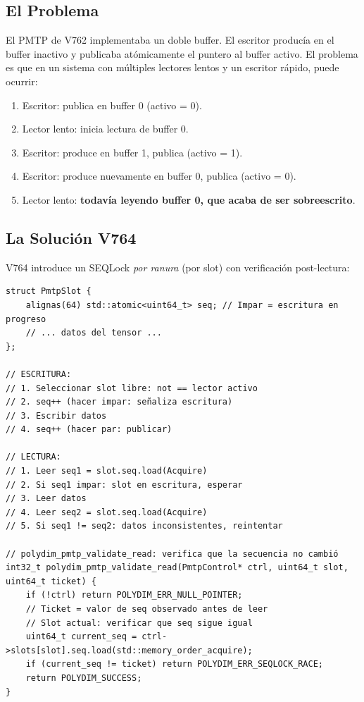 \subsection{El Problema}

El PMTP de V762 implementaba un doble buffer. El escritor producía en el buffer
inactivo y publicaba atómicamente el puntero al buffer activo. El problema es que
en un sistema con múltiples lectores lentos y un escritor rápido, puede ocurrir:

\begin{enumerate}
\item Escritor: publica en buffer 0 (activo = 0).
\item Lector lento: inicia lectura de buffer 0.
\item Escritor: produce en buffer 1, publica (activo = 1).
\item Escritor: produce nuevamente en buffer 0, publica (activo = 0).
\item Lector lento: \textbf{todavía leyendo buffer 0, que acaba de ser sobreescrito}.
\end{enumerate}

\subsection{La Solución V764}

V764 introduce un SEQLock \textit{por ranura} (por slot) con verificación post-lectura:

\begin{lstlisting}[style=cppstyle, caption={PMTP Triple Buffer con SEQLock por ranura --- V764}, label=lst:pmtp_triple]
struct PmtpSlot {
    alignas(64) std::atomic<uint64_t> seq; // Impar = escritura en progreso
    // ... datos del tensor ...
};

// ESCRITURA:
// 1. Seleccionar slot libre: not == lector activo
// 2. seq++ (hacer impar: señaliza escritura)
// 3. Escribir datos
// 4. seq++ (hacer par: publicar)

// LECTURA:
// 1. Leer seq1 = slot.seq.load(Acquire)
// 2. Si seq1 impar: slot en escritura, esperar
// 3. Leer datos
// 4. Leer seq2 = slot.seq.load(Acquire)
// 5. Si seq1 != seq2: datos inconsistentes, reintentar

// polydim_pmtp_validate_read: verifica que la secuencia no cambió
int32_t polydim_pmtp_validate_read(PmtpControl* ctrl, uint64_t slot, uint64_t ticket) {
    if (!ctrl) return POLYDIM_ERR_NULL_POINTER;
    // Ticket = valor de seq observado antes de leer
    // Slot actual: verificar que seq sigue igual
    uint64_t current_seq = ctrl->slots[slot].seq.load(std::memory_order_acquire);
    if (current_seq != ticket) return POLYDIM_ERR_SEQLOCK_RACE;
    return POLYDIM_SUCCESS;
}
\end{lstlisting}

